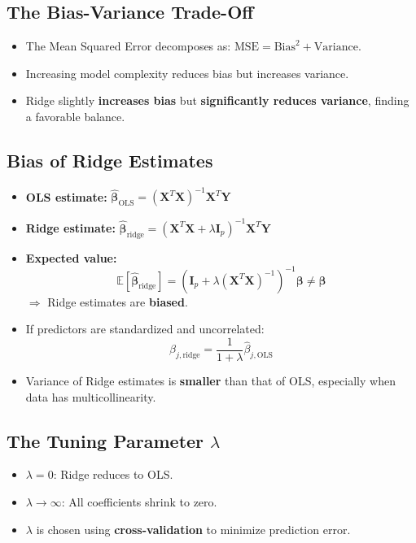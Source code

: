 \documentclass{article}
\begin{document}
\subsection{The Bias-Variance Trade-Off}
\begin{itemize}
    \item The Mean Squared Error decomposes as: $\text{MSE} = \text{Bias}^2 + \text{Variance}$.
    \item Increasing model complexity reduces bias but increases variance.
    \item Ridge slightly \textbf{increases bias} but \textbf{significantly reduces variance}, finding a favorable balance.
\end{itemize}

\subsection{Bias of Ridge Estimates}
\begin{itemize}
    \item \textbf{OLS estimate:} $\hat{\boldsymbol{\beta}}_{\text{OLS}} = (\mathbf{X}^T\mathbf{X})^{-1}\mathbf{X}^T\mathbf{Y}$
    \item \textbf{Ridge estimate:} $\hat{\boldsymbol{\beta}}_{\text{ridge}} = (\mathbf{X}^T\mathbf{X} + \lambda \mathbf{I}_p)^{-1}\mathbf{X}^T\mathbf{Y}$
    \item \textbf{Expected value:}
    $$\mathbb{E}[\hat{\boldsymbol{\beta}}_{\text{ridge}}] = (\mathbf{I}_p + \lambda (\mathbf{X}^T\mathbf{X})^{-1})^{-1} \boldsymbol{\beta} \neq \boldsymbol{\beta}$$
    $\Rightarrow$ Ridge estimates are \textbf{biased}.
    \item If predictors are standardized and uncorrelated:
    $$\hat{\beta}_{j,\text{ridge}} = \frac{1}{1 + \lambda} \hat{\beta}_{j,\text{OLS}}$$
    \item Variance of Ridge estimates is \textbf{smaller} than that of OLS, especially when data has multicollinearity.
\end{itemize}

\subsection{The Tuning Parameter $\lambda$}
\begin{itemize}
    \item $\lambda = 0$: Ridge reduces to OLS.
    \item $\lambda \to \infty$: All coefficients shrink to zero.
    \item $\lambda$ is chosen using \textbf{cross-validation} to minimize prediction error.
\end{itemize}
\end{document}
